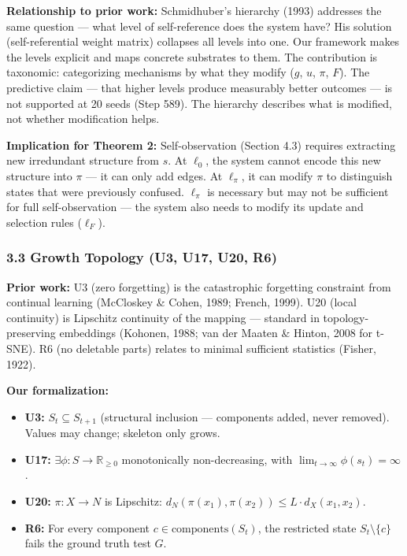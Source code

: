 \documentclass[
  11pt,
]{article}
\providecommand{\tightlist}{%
  \setlength{\itemsep}{0pt}\setlength{\parskip}{0pt}}
\begin{document}
\textbf{Relationship to prior work:} Schmidhuber's hierarchy (1993)
addresses the same question --- what level of self-reference does the
system have? His solution (self-referential weight matrix) collapses all
levels into one. Our framework makes the levels explicit and maps
concrete substrates to them. The contribution is taxonomic: categorizing
mechanisms by what they modify (\(g\), \(u\), \(\pi\), \(F\)). The
predictive claim --- that higher levels produce measurably better
outcomes --- is not supported at 20 seeds (Step 589). The hierarchy
describes what is modified, not whether modification helps.

\textbf{Implication for Theorem 2:} Self-observation (Section 4.3)
requires extracting new irredundant structure from \(s\). At \(\ell_0\),
the system cannot encode this new structure into \(\pi\) --- it can only
add edges. At \(\ell_\pi\), it can modify \(\pi\) to distinguish states
that were previously confused. \(\ell_\pi\) is necessary but may not be
sufficient for full self-observation --- the system also needs to modify
its update and selection rules (\(\ell_F\)).

\subsubsection{3.3 Growth Topology (U3, U17, U20,
R6)}\label{growth-topology-u3-u17-u20-r6}

\textbf{Prior work:} U3 (zero forgetting) is the catastrophic forgetting
constraint from continual learning (McCloskey \& Cohen, 1989; French,
1999). U20 (local continuity) is Lipschitz continuity of the mapping ---
standard in topology-preserving embeddings (Kohonen, 1988; van der
Maaten \& Hinton, 2008 for t-SNE). R6 (no deletable parts) relates to
minimal sufficient statistics (Fisher, 1922).

\textbf{Our formalization:}

\begin{itemize}
\tightlist
\item
  \textbf{U3:} \(S_t \subseteq S_{t+1}\) (structural inclusion ---
  components added, never removed). Values may change; skeleton only
  grows.
\item
  \textbf{U17:} \(\exists \phi: S \to \mathbb{R}_{\geq 0}\)
  monotonically non-decreasing, with
  \(\lim_{t \to \infty} \phi(s_t) = \infty\).
\item
  \textbf{U20:} \(\pi: X \to N\) is Lipschitz:
  \(d_N(\pi(x_1), \pi(x_2)) \leq L \cdot d_X(x_1, x_2)\).
\item
  \textbf{R6:} For every component \(c \in \text{components}(S_t)\), the
  restricted state \(S_t \setminus \{c\}\) fails the ground truth test
  \(G\).
\end{itemize}
\end{document}
